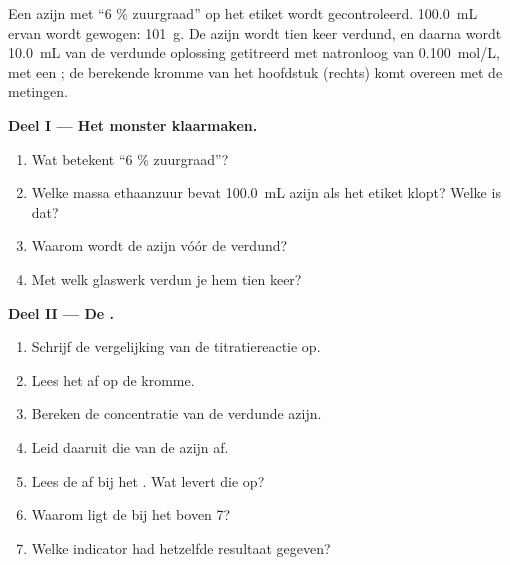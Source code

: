 \begin{problem}
\label{pb:g12:ph-conductivity-titrations:1}
Een azijn met ``6 \% zuurgraad'' op het etiket wordt gecontroleerd.
\qty{100.0}{mL} ervan wordt gewogen: \qty{101}{g}. De azijn wordt tien
keer verdund, en daarna wordt \qty{10.0}{mL} van de verdunde oplossing
getitreerd met natronloog van \qty{0.100}{mol/L}, met een ; de
berekende kromme van het hoofdstuk (rechts) komt overeen met de metingen.

\medskip
\noindent\textbf{Deel I --- Het monster klaarmaken.}
\begin{enumerate}
  \item Wat betekent ``6 \% zuurgraad''?
  \item Welke massa ethaanzuur bevat \qty{100.0}{mL} azijn als het
        etiket klopt? Welke  is dat?
  \item Waarom wordt de azijn vóór de  verdund?
  \item Met welk glaswerk verdun je hem tien keer?
\end{enumerate}

\medskip
\noindent\textbf{Deel II --- De .}
\begin{enumerate}[resume]
  \item Schrijf de vergelijking van de titratiereactie op.
  \item Lees het  af op de kromme.
  \item Bereken de concentratie van de verdunde azijn.
  \item Leid daaruit die van de azijn af.
  \item Lees de  af bij het . Wat levert die op?
  \item Waarom ligt de  bij het  boven 7?
  \item Welke indicator had hetzelfde resultaat gegeven?
\end{enumerate}


\end{problem}
